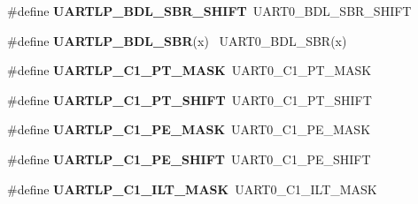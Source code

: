\begin{DoxyCompactItemize}
\item 
\hypertarget{group___backward___compatibility___symbols_ga8d8755af50afa7907f2c6124816ce6c0}{}\#define {\bfseries U\+A\+R\+T\+L\+P\+\_\+\+B\+D\+L\+\_\+\+S\+B\+R\+\_\+\+S\+H\+I\+F\+T}~U\+A\+R\+T0\+\_\+\+B\+D\+L\+\_\+\+S\+B\+R\+\_\+\+S\+H\+I\+F\+T\label{group___backward___compatibility___symbols_ga8d8755af50afa7907f2c6124816ce6c0}

\item 
\hypertarget{group___backward___compatibility___symbols_ga97e34f8e26f2bb993e31e1b53e738b51}{}\#define {\bfseries U\+A\+R\+T\+L\+P\+\_\+\+B\+D\+L\+\_\+\+S\+B\+R}(x)                                            ~U\+A\+R\+T0\+\_\+\+B\+D\+L\+\_\+\+S\+B\+R(x)\label{group___backward___compatibility___symbols_ga97e34f8e26f2bb993e31e1b53e738b51}

\item 
\hypertarget{group___backward___compatibility___symbols_ga6f06cd43d0baed63132675d89a9b89ff}{}\#define {\bfseries U\+A\+R\+T\+L\+P\+\_\+\+C1\+\_\+\+P\+T\+\_\+\+M\+A\+S\+K}~U\+A\+R\+T0\+\_\+\+C1\+\_\+\+P\+T\+\_\+\+M\+A\+S\+K\label{group___backward___compatibility___symbols_ga6f06cd43d0baed63132675d89a9b89ff}

\item 
\hypertarget{group___backward___compatibility___symbols_ga97ce472c10fd61704932180dc3e26d51}{}\#define {\bfseries U\+A\+R\+T\+L\+P\+\_\+\+C1\+\_\+\+P\+T\+\_\+\+S\+H\+I\+F\+T}~U\+A\+R\+T0\+\_\+\+C1\+\_\+\+P\+T\+\_\+\+S\+H\+I\+F\+T\label{group___backward___compatibility___symbols_ga97ce472c10fd61704932180dc3e26d51}

\item 
\hypertarget{group___backward___compatibility___symbols_ga23f4f361b83573abfc5cfd6f15ef3a89}{}\#define {\bfseries U\+A\+R\+T\+L\+P\+\_\+\+C1\+\_\+\+P\+E\+\_\+\+M\+A\+S\+K}~U\+A\+R\+T0\+\_\+\+C1\+\_\+\+P\+E\+\_\+\+M\+A\+S\+K\label{group___backward___compatibility___symbols_ga23f4f361b83573abfc5cfd6f15ef3a89}

\item 
\hypertarget{group___backward___compatibility___symbols_gacce781ed7eeeb5e51a145dfec1848406}{}\#define {\bfseries U\+A\+R\+T\+L\+P\+\_\+\+C1\+\_\+\+P\+E\+\_\+\+S\+H\+I\+F\+T}~U\+A\+R\+T0\+\_\+\+C1\+\_\+\+P\+E\+\_\+\+S\+H\+I\+F\+T\label{group___backward___compatibility___symbols_gacce781ed7eeeb5e51a145dfec1848406}

\item 
\hypertarget{group___backward___compatibility___symbols_ga0efd0cf26f2b583d1b21cc8cc3f487fe}{}\#define {\bfseries U\+A\+R\+T\+L\+P\+\_\+\+C1\+\_\+\+I\+L\+T\+\_\+\+M\+A\+S\+K}~U\+A\+R\+T0\+\_\+\+C1\+\_\+\+I\+L\+T\+\_\+\+M\+A\+S\+K\label{group___backward___compatibility___symbols_ga0efd0cf26f2b583d1b21cc8cc3f487fe}


\end{DoxyCompactItemize}
